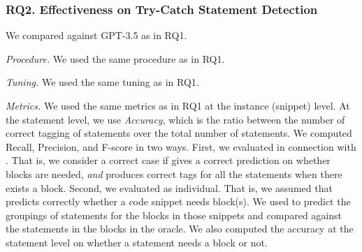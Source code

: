 \subsubsection{RQ2. Effectiveness on Try-Catch Statement Detection}
 We compared {\xstate} against GPT-3.5 as in RQ1.


{\em Procedure.} We used the same procedure as in RQ1.

{\em Tuning.} We used the same tuning as in RQ1.

{\em Metrics.} We used the same metrics as in RQ1 at the instance (snippet)
level.  At the statement level, we use {\em Accuracy}, which is the
ratio between the number of correct tagging of statements over the
total number of statements. We computed Recall, Precision,
and F-score in two ways. First, we evaluated {\xstate} in connection
with {\xblock}. That is, we consider a correct case if {\xblock} gives
a correct prediction on whether
 blocks are needed, {\em and} {\xstate} produces
correct tags for all the statements when there exists
a  block. Second, we evaluated {\xstate} as
individual. That is, we assumed that {\xblock} predicts correctly
whether a code snippet needs  block(s). We
used {\xstate} to predict the groupings of statements for the blocks
in those snippets and compared against the statements in the blocks in
the oracle. We also computed the accuracy at the statement level on
whether a statement needs a  block or not.




